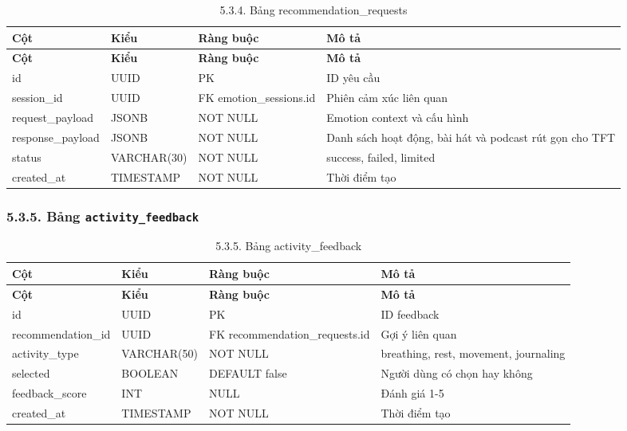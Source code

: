 \documentclass[12pt,a4paper]{article}
\begin{document}
\begin{center}
\scriptsize
\begin{longtable}{|P{0.18\textwidth}|P{0.25\textwidth}|P{0.25\textwidth}|P{0.22\textwidth}|}
\caption{5.3.4. Bảng recommendation\_requests}\\
\hline
\textbf{Cột} & \textbf{Kiểu} & \textbf{Ràng buộc} & \textbf{Mô tả} \\
\hline
\endfirsthead
\hline
\textbf{Cột} & \textbf{Kiểu} & \textbf{Ràng buộc} & \textbf{Mô tả} \\
\hline
\endhead
id & UUID & PK & ID yêu cầu \\
\hline
session\_id & UUID & FK emotion\_sessions.id & Phiên cảm xúc liên quan \\
\hline
request\_payload & JSONB & NOT NULL & Emotion context và cấu hình \\
\hline
response\_payload & JSONB & NOT NULL & Danh sách hoạt động, bài hát và podcast rút gọn cho TFT \\
\hline
status & VARCHAR(30) & NOT NULL & success, failed, limited \\
\hline
created\_at & TIMESTAMP & NOT NULL & Thời điểm tạo \\
\hline
\end{longtable}
\normalsize
\end{center}

\subsubsection*{5.3.5. Bảng \texttt{activity\_feedback}}

\begin{center}
\scriptsize
\begin{longtable}{|P{0.18\textwidth}|P{0.25\textwidth}|P{0.25\textwidth}|P{0.22\textwidth}|}
\caption{5.3.5. Bảng activity\_feedback}\\
\hline
\textbf{Cột} & \textbf{Kiểu} & \textbf{Ràng buộc} & \textbf{Mô tả} \\
\hline
\endfirsthead
\hline
\textbf{Cột} & \textbf{Kiểu} & \textbf{Ràng buộc} & \textbf{Mô tả} \\
\hline
\endhead
id & UUID & PK & ID feedback \\
\hline
recommendation\_id & UUID & FK recommendation\_requests.id & Gợi ý liên quan \\
\hline
activity\_type & VARCHAR(50) & NOT NULL & breathing, rest, movement, journaling \\
\hline
selected & BOOLEAN & DEFAULT false & Người dùng có chọn hay không \\
\hline
feedback\_score & INT & NULL & Đánh giá 1-5 \\
\hline
created\_at & TIMESTAMP & NOT NULL & Thời điểm tạo \\
\hline
\end{longtable}
\normalsize
\end{center}
\end{document}
